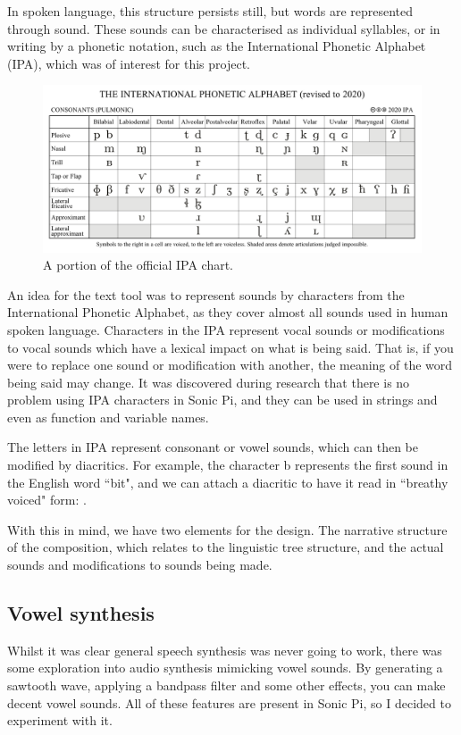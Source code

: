 \documentclass[12pt,a4paper,twoside,openright]{report}
\begin{document}
In spoken language, this structure persists still, but words are represented through sound. These sounds can be characterised as individual syllables, or in writing by a phonetic notation, such as the International Phonetic Alphabet (IPA), which was of interest for this project.
\begin{figure}[h]
    \centering
    \includegraphics[scale=0.3]{images/IPA.png}
    \caption{A portion of the official IPA chart.\protect\footnotemark}
    \label{fig:ipa_chart}
\end{figure}

An idea for the text tool was to represent sounds by characters from the International Phonetic Alphabet, as they cover almost all sounds used in human spoken language. Characters in the IPA represent vocal sounds or modifications to vocal sounds which have a lexical impact on what is being said. That is, if you were to replace one sound or modification with another, the meaning of the word being said may change. It was discovered during research that there is no problem using IPA characters in Sonic Pi, and they can be used in strings and even as function and variable names.

The letters in IPA represent consonant or vowel sounds, which can then be modified by diacritics. For example, the character b represents the first sound in the English word ``bit", and we can attach a diacritic to have it read in ``breathy voiced" form: .

With this in mind, we have two elements for the design. The narrative structure of the composition, which relates to the linguistic tree structure, and the actual sounds and modifications to sounds being made.

\subsection{Vowel synthesis}
Whilst it was clear general speech synthesis was never going to work, there was some exploration into audio synthesis mimicking vowel sounds. By generating a sawtooth wave, applying a bandpass filter and some other effects, you can make decent vowel sounds. All of these features are present in Sonic Pi, so I decided to experiment with it.
\end{document}
